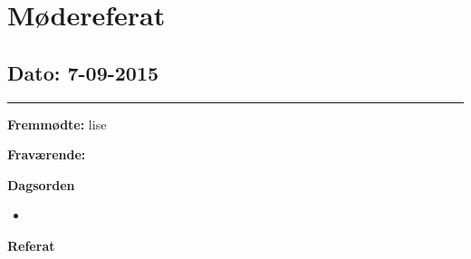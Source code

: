 \chapter{Mødereferat}

\section{Dato: 7-09-2015}
\hrule

\textbf{Fremmødte:} lise 

\textbf{Fraværende:} 

\textbf{Dagsorden}
\\
\begin{itemize}
	\item 
\end{itemize}

\textbf{Referat}

